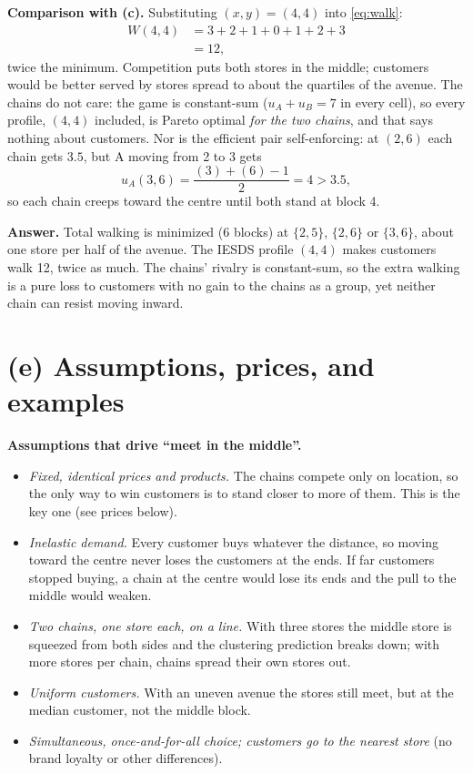 \documentclass[11pt,a4paper]{article}
\newcommand{\answer}[1]{\begin{tcolorbox}[colback=ans!5,colframe=ans,boxrule=0.6pt,
  left=5pt,right=5pt,top=3pt,bottom=3pt]\textbf{Answer.} #1\end{tcolorbox}}
\begin{document}
\textbf{Comparison with (c).} Substituting $(x, y) = (4, 4)$ into \eqref{eq:walk}:
\begin{align*}
  W(4, 4) &= 3 + 2 + 1 + 0 + 1 + 2 + 3\\
          &= 12,
\end{align*}
twice the minimum. Competition puts both stores in the middle; customers would be better served
by stores spread to about the quartiles of the avenue. The chains do not care: the game is
constant-sum ($u_A + u_B = 7$ in every cell), so every profile, $(4, 4)$ included, is Pareto
optimal \emph{for the two chains}, and that says nothing about customers. Nor is the efficient
pair self-enforcing: at $(2, 6)$ each chain gets $3.5$, but A moving from 2 to 3 gets
\[
  u_A(3, 6) = \frac{(3) + (6) - 1}{2} = 4 > 3.5,
\]
so each chain creeps toward the centre until both stand at block 4.

\answer{Total walking is minimized (6 blocks) at $\{2, 5\}$, $\{2, 6\}$ or $\{3, 6\}$, about one
store per half of the avenue. The IESDS profile $(4, 4)$ makes customers walk 12, twice as much.
The chains' rivalry is constant-sum, so the extra walking is a pure loss to customers with no
gain to the chains as a group, yet neither chain can resist moving inward.}

\section*{(e) Assumptions, prices, and examples}

\textbf{Assumptions that drive ``meet in the middle''.}
\begin{itemize}
  \item \emph{Fixed, identical prices and products.} The chains compete only on location, so the
        only way to win customers is to stand closer to more of them. This is the key one (see
        prices below).
  \item \emph{Inelastic demand.} Every customer buys whatever the distance, so moving toward the
        centre never loses the customers at the ends. If far customers stopped buying, a chain
        at the centre would lose its ends and the pull to the middle would weaken.
  \item \emph{Two chains, one store each, on a line.} With three stores the middle store is
        squeezed from both sides and the clustering prediction breaks down; with more stores per
        chain, chains spread their own stores out.
  \item \emph{Uniform customers.} With an uneven avenue the stores still meet, but at the median
        customer, not the middle block.
  \item \emph{Simultaneous, once-and-for-all choice; customers go to the nearest store}
        (no brand loyalty or other differences).
\end{itemize}
\end{document}
